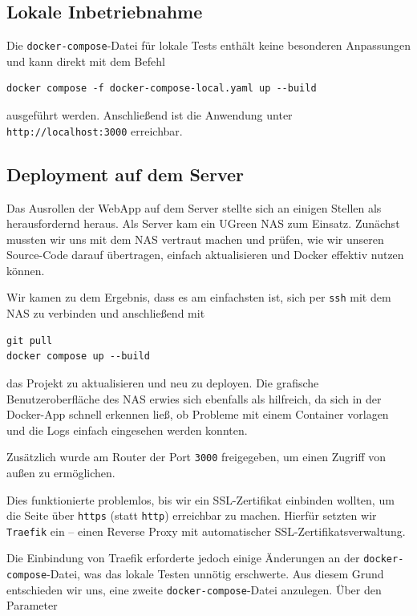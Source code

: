 \documentclass[oneside]{ausarbeitung}
\begin{document}
\subsection{Lokale Inbetriebnahme}

Die \texttt{docker-compose}-Datei für lokale Tests enthält keine besonderen Anpassungen und kann direkt mit dem Befehl

\begin{verbatim}
docker compose -f docker-compose-local.yaml up --build
\end{verbatim}

ausgeführt werden.  
Anschließend ist die Anwendung unter \texttt{http://localhost:3000} erreichbar.

\subsection{Deployment auf dem Server}

Das Ausrollen der WebApp auf dem Server stellte sich an einigen Stellen als herausfordernd heraus.  
Als Server kam ein UGreen NAS zum Einsatz. Zunächst mussten wir uns mit dem NAS vertraut machen und prüfen, wie wir unseren Source-Code darauf übertragen, einfach aktualisieren und Docker effektiv nutzen können.  

Wir kamen zu dem Ergebnis, dass es am einfachsten ist, sich per \texttt{ssh} mit dem NAS zu verbinden und anschließend mit

\begin{verbatim}
git pull
docker compose up --build
\end{verbatim}

das Projekt zu aktualisieren und neu zu deployen.  
Die grafische Benutzeroberfläche des NAS erwies sich ebenfalls als hilfreich, da sich in der Docker-App schnell erkennen ließ, ob Probleme mit einem Container vorlagen und die Logs einfach eingesehen werden konnten.  

Zusätzlich wurde am Router der Port \texttt{3000} freigegeben, um einen Zugriff von außen zu ermöglichen.

Dies funktionierte problemlos, bis wir ein SSL-Zertifikat einbinden wollten, um die Seite über \texttt{https} (statt \texttt{http}) erreichbar zu machen. Hierfür setzten wir \texttt{Traefik} ein – einen Reverse Proxy mit automatischer SSL-Zertifikatsverwaltung.  

Die Einbindung von Traefik erforderte jedoch einige Änderungen an der \texttt{docker-compose}-Datei, was das lokale Testen unnötig erschwerte.  
Aus diesem Grund entschieden wir uns, eine zweite \texttt{docker-compose}-Datei anzulegen. Über den Parameter
\end{document}
